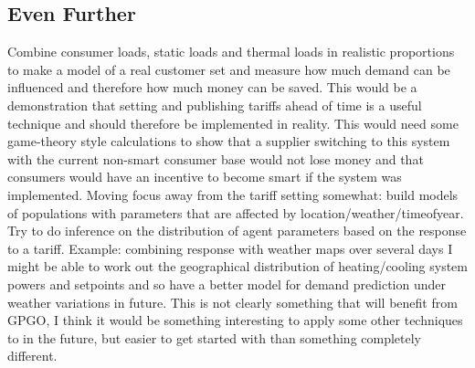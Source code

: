 \documentclass[11pt]{article}
\begin{document}
\subsection{Even Further}
Combine consumer loads, static loads and thermal loads in realistic proportions to make a model of a real customer set and measure how much demand can be influenced and therefore how much money can be saved. This would be a demonstration that setting and publishing tariffs ahead of time is a useful technique and should therefore be implemented in reality. This would need some game-theory style calculations to show that a supplier switching to this system with the current non-smart consumer base would not lose money and that consumers would have an incentive to become smart if the system was implemented.
Moving focus away from the tariff setting somewhat: build models of populations with parameters that are affected by location/weather/timeofyear. Try to do inference on the distribution of agent parameters based on the response
to a tariff. Example: combining response with weather maps over several days I might be able to work out the geographical distribution of heating/cooling system powers and setpoints and so have a better model for demand prediction under weather variations in future. This is not clearly something that will benefit from GPGO, I think it would be something interesting to apply some other techniques to in the future, but easier to get started with than something completely different.

{}

\end{document}
